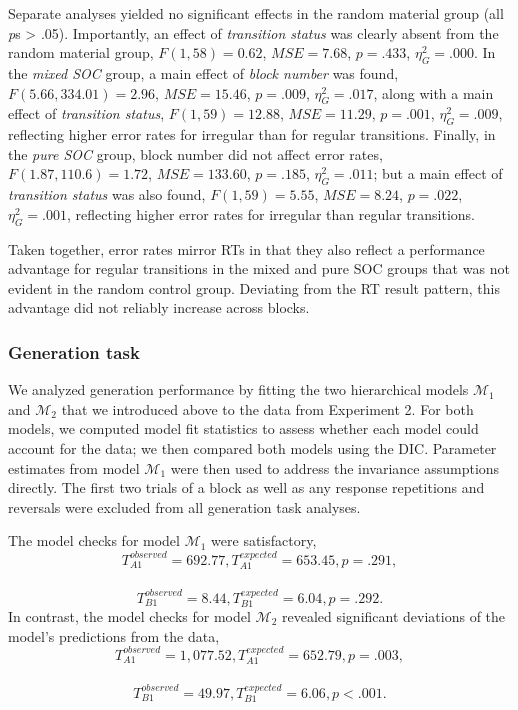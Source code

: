 \documentclass[floatsintext,man]{apa6}
\begin{document}
Separate analyses yielded no significant effects in the random material
group (all \emph{p}s \textgreater{} .05). Importantly, an effect of
\emph{transition status} was clearly absent from the random material
group, \(F(1, 58) = 0.62\), \(\mathit{MSE} = 7.68\), \(p = .433\),
\(\eta^2_G = .000\). In the \emph{mixed SOC} group, a main effect of
\emph{block number} was found, \(F(5.66, 334.01) = 2.96\),
\(\mathit{MSE} = 15.46\), \(p = .009\), \(\eta^2_G = .017\), along with
a main effect of \emph{transition status}, \(F(1, 59) = 12.88\),
\(\mathit{MSE} = 11.29\), \(p = .001\), \(\eta^2_G = .009\), reflecting
higher error rates for irregular than for regular transitions. Finally,
in the \emph{pure SOC} group, block number did not affect error rates,
\(F(1.87, 110.6) = 1.72\), \(\mathit{MSE} = 133.60\), \(p = .185\),
\(\eta^2_G = .011\); but a main effect of \emph{transition status} was
also found, \(F(1, 59) = 5.55\), \(\mathit{MSE} = 8.24\), \(p = .022\),
\(\eta^2_G = .001\), reflecting higher error rates for irregular than
regular transitions.

Taken together, error rates mirror RTs in that they also reflect a
performance advantage for regular transitions in the mixed and pure SOC
groups that was not evident in the random control group. Deviating from
the RT result pattern, this advantage did not reliably increase across
blocks.

\subsubsection{Generation task}\label{generation-task-1}

We analyzed generation performance by fitting the two hierarchical
models \(\mathcal{M}_1\) and \(\mathcal{M}_2\) that we introduced above
to the data from Experiment 2. For both models, we computed model fit
statistics to assess whether each model could account for the data; we
then compared both models using the DIC. Parameter estimates from model
\(\mathcal{M}_1\) were then used to address the invariance assumptions
directly. The first two trials of a block as well as any response
repetitions and reversals were excluded from all generation task
analyses.

The model checks for model \(\mathcal{M}_1\) were satisfactory,
\[T_{A1}^{observed} = 692.77, T_{A1}^{expected} = 653.45, p = .291,\]~
\[T_{B1}^{observed} = 8.44, T_{B1}^{expected} = 6.04, p = .292.\] In
contrast, the model checks for model \(\mathcal{M}_2\) revealed
significant deviations of the model's predictions from the data,
\[T_{A1}^{observed} = 1,077.52, T_{A1}^{expected} = 652.79, p = .003,\]~
\[T_{B1}^{observed} = 49.97, T_{B1}^{expected} = 6.06, p < .001.\]
\end{document}
